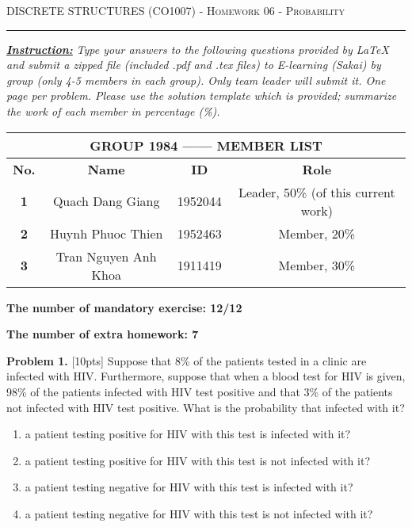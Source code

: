 \documentclass[12pt]{amsart}
\begin{document}
\pagestyle{plain}
{\scshape } \hfill {\scshape DISCRETE STRUCTURES (CO1007) - Homework 06 - Probability} \hfill {\scshape }
 
\smallskip

\hrule

\bigskip
\textbf{\underline {\textit{Instruction:}}}
\textit{Type your answers to the following questions provided by LaTeX and submit a zipped file
(included .pdf and .tex files) to E-learning (Sakai) by group (only 4-5 members in each group). Only team
leader will submit it. One page per problem. Please use the solution template which is provided; summarize
the work of each member in percentage (\%).}

\bigskip
\begin{table}[h]
\begin{tabular}{|c|c|c|c|}
\hline
\multicolumn{4}{|c|}{\textbf{GROUP 1984 ------ MEMBER LIST}}        \\ \hline
\textbf{No.} & \textbf{Name}        & \textbf{ID} & \textbf{Role} \\ \hline
\textbf{1}   & Quach Dang Giang     & 1952044     & Leader, 50\% (of this current work)  \\ \hline
\textbf{2}   & Huynh Phuoc Thien    & 1952463     & Member, 20\%  \\ \hline
\textbf{3}   & Tran Nguyen Anh Khoa & 1911419     & Member, 30\%  \\ \hline
\end{tabular}
\end{table}
\bigskip

\textbf{The number of mandatory exercise: 12/12}  

\bigskip
\textbf{The number of extra homework: 7}

\bigskip
\textbf{Problem 1.} [10pts] Suppose that 8\% of the patients tested in a clinic are infected with HIV. Furthermore,
suppose that when a blood test for HIV is given, 98\% of the patients infected with HIV test positive and
that 3\% of the patients not infected with HIV test positive. What is the probability that infected with it?
\bigskip


\begin{enumerate}

\item  a patient testing positive for HIV with this test is infected with it?

\medskip

\item  a patient testing positive for HIV with this test is not infected with it?

\medskip

\item  a patient testing negative for HIV with this test is infected with it?

\medskip

\item  a patient testing negative for HIV with this test is not infected with it?

\medskip

\end{enumerate}
\end{document}
